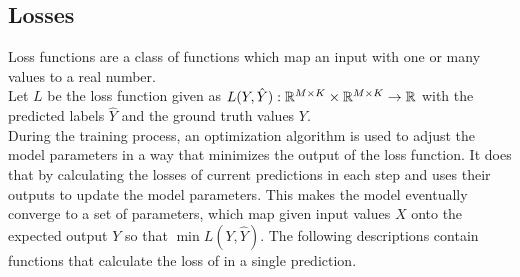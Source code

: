 \subsection{Losses}\label{subsec:losses}
Loss functions are a class of functions which map an input with one or many values to a real number.\\
Let $L$ be the loss function given as
$L(Y, {\hat{Y})}: \mathbb{R}^{M\times K}\times\mathbb{R}^{M\times K} \rightarrow \mathbb{R}$ with the predicted labels $\hat{Y}$ and the ground truth values $Y$.\\
During the training process, an optimization algorithm is used to adjust the model parameters in a way that minimizes the output of the loss function.
It does that by calculating the losses of current predictions in each step and uses their outputs to update the model parameters.
This makes the model eventually converge to a set of parameters, which map given input values $X$ onto the expected output $Y$ so that $\min L(Y,{\hat{Y}})$.
The following descriptions contain functions that calculate the loss of in a single prediction.

